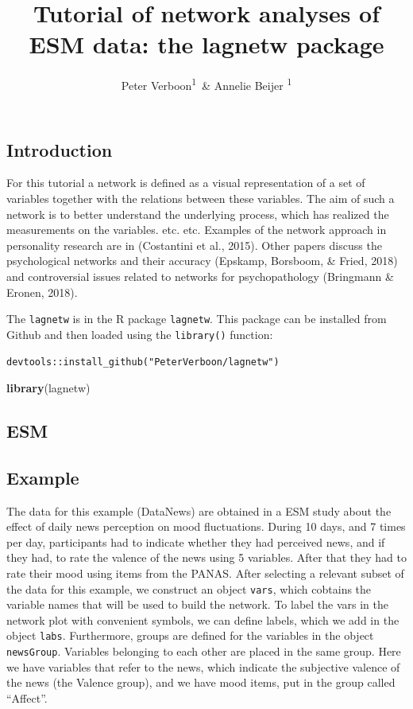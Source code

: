 \documentclass[man,floatsintext]{apa6}
\title{Tutorial of network analyses of ESM data: the lagnetw package}
\author{Peter Verboon\textsuperscript{1}~\& Annelie Beijer \textsuperscript{1 }}
\date{}
\affiliation{
\vspace{0.5cm}
\textsuperscript{1} Open University}
\newenvironment{Shaded}{\begin{snugshade}}{\end{snugshade}}
\newcommand{\KeywordTok}[1]{\textcolor[rgb]{0.13,0.29,0.53}{\textbf{#1}}}
\newcommand{\NormalTok}[1]{#1}
\begin{document}
\maketitle

\subsection{Introduction}\label{introduction}

For this tutorial a network is defined as a visual representation of a
set of variables together with the relations between these variables.
The aim of such a network is to better understand the underlying
process, which has realized the measurements on the variables. etc. etc.
Examples of the network approach in personality research are in
(Costantini et al., 2015). Other papers discuss the psychological
networks and their accuracy (Epskamp, Borsboom, \& Fried, 2018) and
controversial issues related to networks for psychopathology (Bringmann
\& Eronen, 2018).

The \texttt{lagnetw} is in the R package \texttt{lagnetw}. This package
can be installed from Github and then loaded using the
\texttt{library()} function:

\texttt{devtools::install\_github("PeterVerboon/lagnetw")}

\begin{Shaded}
\begin{Highlighting}[]
\KeywordTok{library}\NormalTok{(lagnetw)}
\end{Highlighting}
\end{Shaded}

\subsection{ESM}\label{esm}

\subsection{Example}\label{example}

The data for this example (DataNews) are obtained in a ESM study about
the effect of daily news perception on mood fluctuations. During 10
days, and 7 times per day, participants had to indicate whether they had
perceived news, and if they had, to rate the valence of the news using 5
variables. After that they had to rate their mood using items from the
PANAS. After selecting a relevant subset of the data for this example,
we construct an object \texttt{vars}, which cobtains the variable names
that will be used to build the network. To label the vars in the network
plot with convenient symbols, we can define labels, which we add in the
object \texttt{labs}. Furthermore, groups are defined for the variables
in the object \texttt{newsGroup}. Variables belonging to each other are
placed in the same group. Here we have variables that refer to the news,
which indicate the subjective valence of the news (the Valence group),
and we have mood items, put in the group called \enquote{Affect}.
\end{document}
